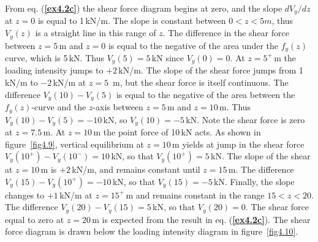 \documentclass{AeroStructure-ERJohnson}
\begin{document}
\begin{example*}
\noindent From eq. (\textbf{\ref{ex4.2c}}) the shear force\enlargethispage{-1.6\baselineskip} diagram begins at zero, and the slope $d V_{y}/d z$ at $z = 0$ is equal to 1\,kN/m. The slope is constant between $0<z<5 m$, thus ${V}_y(z)$ is a straight line in this range of $z$. The difference in the shear force between $z = 5$\,m and $z = 0$ is equal to the negative of the area under the $f_{y}(z)$ curve, which is 5\,kN. Thus ${V}_y(5) = 5$\,kN since ${V}_y(0) = 0$.  At $z = 5^+$\,m the loading intensity jumps to $+2$\,kN/m. The slope of the shear force jumps from 1\,kN/m to $-2$\,kN/m at $z = 5$~m, but the shear force is itself continuous. The difference $V_y(10) - V_y(5)$ is equal to the negative of the area between the $f_{y}(z)$-curve and the $z$-axis between $z = 5$\,m and $z = 10$\,m. Thus ${V}_y(10) - {V}_y(5) = -10$\,kN, so ${V}_y(10) = -5$\,kN. Note the shear force is zero at $z = 7.5$\,m. At $z = 10$\,m the point force of 10\,kN acts. As shown in figure~\ref{fig4.9}, vertical equilibrium at $z = 10$\,m yields at jump in the shear force ${V}_y(10^+) - {V}_y(10^-) = 10$\,kN, so that ${V}_y(10^+) = 5$\,kN. The slope of the shear at ${z} = 10$\,m is $+2$\,kN/m, and remains constant until $z = 15$\,m. The difference ${V}_y(15) - {V}_y(10^+) = -10$\,kN, so that ${V}_y(15) = -5$\,kN. Finally, the slope changes to $+1$\,kN/m at $z = 15^+$\,m and remains constant in the range $15 < z < 20$. The difference ${V}_y(20) - {V}_y(15) = 5$\,kN, so that ${V}_y(20) = 0$. The shear force equal to zero at $z = 20$\,m is expected from the result in eq. (\textbf{\ref{ex4.2c}}). The shear force diagram is drawn below the loading intensity diagram in figure~\ref{fig4.10}.
{\def\thefigure{4.10}
}
\end{example*}
\end{document}
